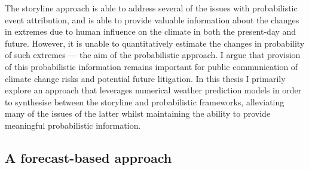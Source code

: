    The storyline approach is able to address several of the issues with probabilistic event attribution, and is able to provide valuable information about the changes in extremes due to human influence on the climate in both the present-day and future. However, it is unable to quantitatively estimate the changes in probability of such extremes --- the aim of the probabilistic approach. I argue that provision of this probabilistic information remains important for public communication of climate change risks and potential future litigation. In this thesis I primarily explore an approach that leverages numerical weather prediction models in order to synthesise between the storyline and probabilistic frameworks, alleviating many of the issues of the latter whilst maintaining the ability to provide meaningful probabilistic information.

  \subsection{A forecast-based approach}\label{intro:forecast}


